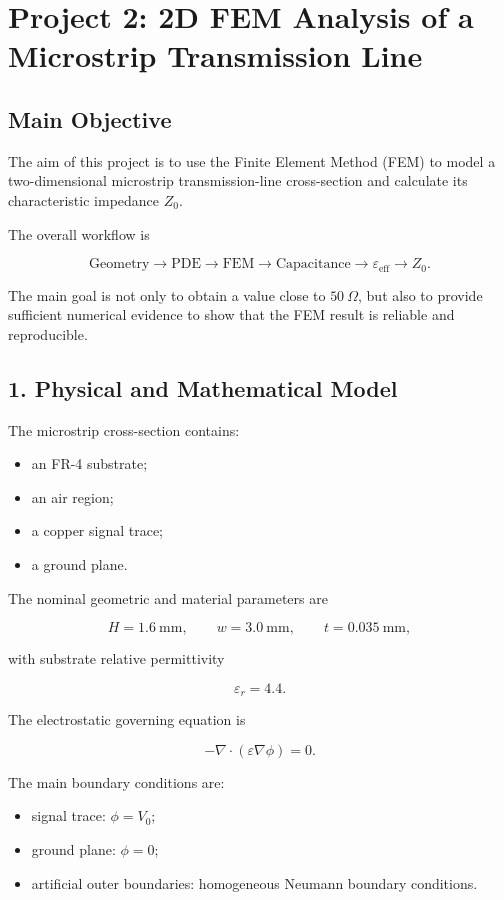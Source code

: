 \section*{Project 2: 2D FEM Analysis of a Microstrip Transmission Line}

\subsection*{Main Objective}

The aim of this project is to use the Finite Element Method (FEM) to model a two-dimensional microstrip transmission-line cross-section and calculate its characteristic impedance \(Z_0\).

The overall workflow is

\[
\text{Geometry}
\rightarrow
\text{PDE}
\rightarrow
\text{FEM}
\rightarrow
\text{Capacitance}
\rightarrow
\varepsilon_{\mathrm{eff}}
\rightarrow
Z_0.
\]

The main goal is not only to obtain a value close to \(50~\Omega\), but also to provide sufficient numerical evidence to show that the FEM result is reliable and reproducible.

\subsection*{1. Physical and Mathematical Model}

The microstrip cross-section contains:

\begin{itemize}
    \item an FR-4 substrate;
    \item an air region;
    \item a copper signal trace;
    \item a ground plane.
\end{itemize}

The nominal geometric and material parameters are

\[
H = 1.6~\mathrm{mm},
\qquad
w = 3.0~\mathrm{mm},
\qquad
t = 0.035~\mathrm{mm},
\]

with substrate relative permittivity

\[
\varepsilon_r = 4.4.
\]

The electrostatic governing equation is

\[
-\nabla \cdot \left( \varepsilon \nabla \phi \right) = 0.
\]

The main boundary conditions are:

\begin{itemize}
    \item signal trace: \(\phi = V_0\);
    \item ground plane: \(\phi = 0\);
    \item artificial outer boundaries: homogeneous Neumann boundary conditions.
\end{itemize}

